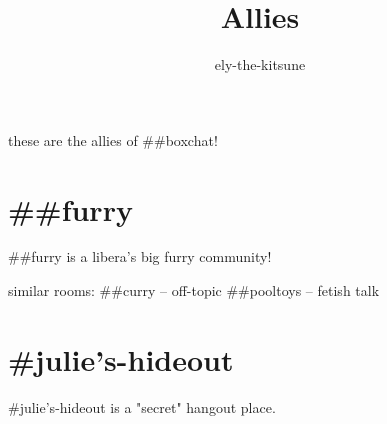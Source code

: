 \title {Allies}
\author {ely-the-kitsune}


  these are the allies of ##boxchat!
  \chapter{\#\#furry}
  \#\#furry is a libera's big furry community!
  
  similar rooms: 
  \#\#curry -- off-topic
  \#\#pooltoys -- fetish talk
  \chapter{\#julie's-hideout}
  \#julie's-hideout is a "secret" hangout place.

